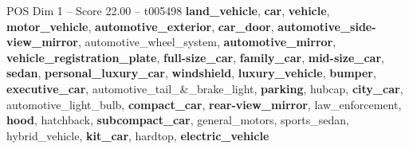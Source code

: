 \begin{textsample}{POS Dim 1 – Score 22.00 – t005498}  \label{ex:f1_pos_011}
\textbf{land\_vehicle}, \textbf{car}, \textbf{vehicle}, \textbf{motor\_vehicle}, \textbf{automotive\_exterior}, \textbf{car\_door}, \textbf{automotive\_side-view\_mirror}, automotive\_wheel\_system, \textbf{automotive\_mirror}, \textbf{vehicle\_registration\_plate}, \textbf{full-size\_car}, \textbf{family\_car}, \textbf{mid-size\_car}, \textbf{sedan}, \textbf{personal\_luxury\_car}, \textbf{windshield}, \textbf{luxury\_vehicle}, \textbf{bumper}, \textbf{executive\_car}, automotive\_tail\_\&\_brake\_light, \textbf{parking}, hubcap, \textbf{city\_car}, automotive\_light\_bulb, \textbf{compact\_car}, \textbf{rear-view\_mirror}, law\_enforcement, \textbf{hood}, hatchback, \textbf{subcompact\_car}, general\_motors, sports\_sedan, hybrid\_vehicle, \textbf{kit\_car}, hardtop, \textbf{electric\_vehicle}

\end{textsample}
